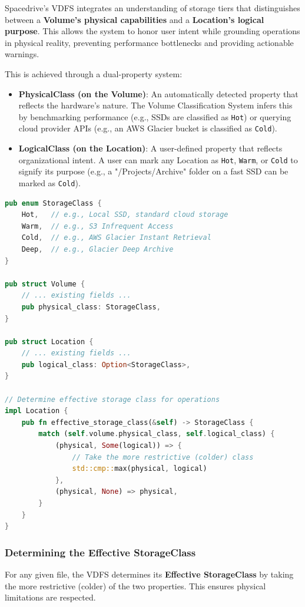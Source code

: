 \documentclass[sigconf]{acmart}
\begin{document}
Spacedrive's VDFS integrates an understanding of storage tiers that distinguishes between a \textbf{Volume's physical capabilities} and a \textbf{Location's logical purpose}. This allows the system to honor user intent while grounding operations in physical reality, preventing performance bottlenecks and providing actionable warnings.

This is achieved through a dual-property system:

\begin{itemize}
\item \textbf{PhysicalClass (on the Volume)}: An automatically detected property that reflects the hardware's nature. The Volume Classification System infers this by benchmarking performance (e.g., SSDs are classified as \texttt{Hot}) or querying cloud provider APIs (e.g., an AWS Glacier bucket is classified as \texttt{Cold}).
\item \textbf{LogicalClass (on the Location)}: A user-defined property that reflects organizational intent. A user can mark any Location as \texttt{Hot}, \texttt{Warm}, or \texttt{Cold} to signify its purpose (e.g., a "/Projects/Archive" folder on a fast SSD can be marked as \texttt{Cold}).
\end{itemize}

\begin{lstlisting}[language=Rust, caption={Hybrid storage classification model}]
pub enum StorageClass {
    Hot,   // e.g., Local SSD, standard cloud storage
    Warm,  // e.g., S3 Infrequent Access
    Cold,  // e.g., AWS Glacier Instant Retrieval
    Deep,  // e.g., Glacier Deep Archive
}

pub struct Volume {
    // ... existing fields ...
    pub physical_class: StorageClass,
}

pub struct Location {
    // ... existing fields ...
    pub logical_class: Option<StorageClass>,
}

// Determine effective storage class for operations
impl Location {
    pub fn effective_storage_class(&self) -> StorageClass {
        match (self.volume.physical_class, self.logical_class) {
            (physical, Some(logical)) => {
                // Take the more restrictive (colder) class
                std::cmp::max(physical, logical)
            },
            (physical, None) => physical,
        }
    }
}
\end{lstlisting}

\subsubsection{Determining the Effective StorageClass}
For any given file, the VDFS determines its \textbf{Effective StorageClass} by taking the more restrictive (colder) of the two properties. This ensures physical limitations are respected.
\end{document}
